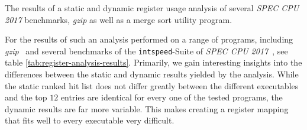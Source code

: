 \begin{table}
	\centering
	\caption{The results of a static and dynamic register usage analysis of several \textit{SPEC CPU 2017} benchmarks, \textit{gzip} as well as a merge sort utility program.}
	\label{tab:register-analysis-results}
\end{table}

For the results of such an analysis performed on a range of programs, including \textit{gzip}~\cite{gzip} and several benchmarks of the \texttt{intspeed}-Suite of \textit{SPEC CPU 2017}~\cite{spec-cpu-2017}, see table \vref{tab:register-analysis-results}.
Primarily, we gain interesting insights into the differences between the static and dynamic results yielded by the analysis.
While the static ranked hit list does not differ greatly between the different executables and the top $12$ entries are identical for every one of the tested programs, the dynamic results are far more variable.
This makes creating a register mapping that fits well to every executable very difficult.

